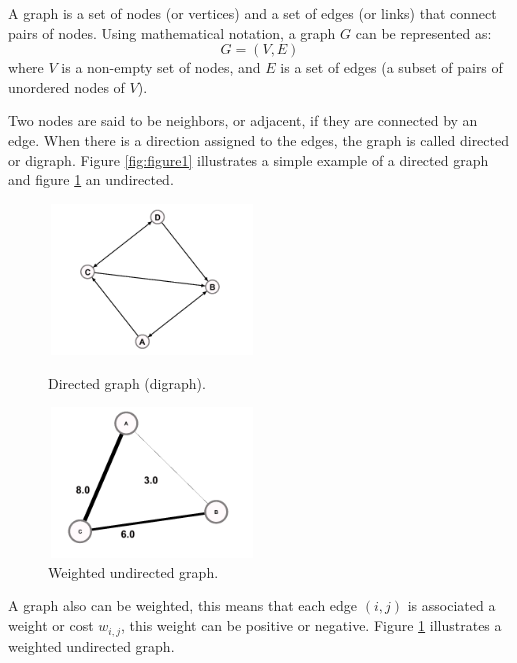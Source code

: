 \documentclass{article}
\begin{document}
\begin{multicols}{2}
A graph is a set of nodes (or vertices) and a set of edges (or links) that connect pairs of nodes. Using mathematical notation, a graph $G$ can be represented as:
$$G=(V,E)$$
where $V$ is a non-empty set of nodes, and $E$ is a set of edges (a subset of pairs of unordered nodes of $V$).

Two nodes are said to be neighbors, or adjacent, if they are connected by an edge. When there is a direction assigned to the edges, the graph is called directed or digraph. Figure \ref{fig:figure1} illustrates a simple example of a directed graph and figure \ref{fig:figure2} an undirected.


\begin{figure}[ht]
\begin{minipage}[b]{0.5\linewidth}
\centering
\includegraphics[width=5.5cm,height=4cm]{Figures/graph_directed}
\caption{Directed graph (digraph).}
\label{fig:figure1}
\end{minipage}
\hspace{0.5cm}
\begin{minipage}[b]{0.4\linewidth}
\centering
\includegraphics[width=5.5cm,height=4cm]{Figures/graph_undirected_weighted}
\caption{Weighted undirected graph.}
\label{fig:figure2}
\end{minipage}
\end{figure}

A graph also can be weighted, this means that each edge $(i,j)$ is associated a weight or cost $w_{i,j}$, this weight can be positive or negative. Figure \ref{fig:figure2} illustrates a weighted undirected graph.



\end{multicols}
\end{document}
